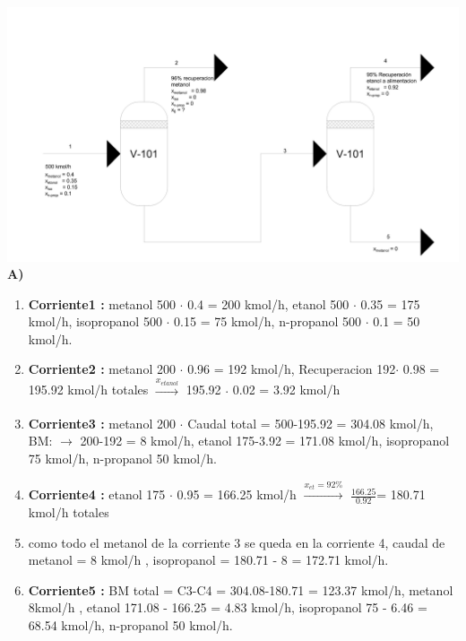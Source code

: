 \documentclass{report}
\begin{document}
\begin{raggedright}
	\includegraphics[width=1\textwidth]{problema1.jpg}\\
\textbf{A)}\\
\vspace{1\baselineskip}
\begin{enumerate}
	\item [] \textbf{Corriente1 :} metanol 500 $\cdot $ 0.4 = 200 kmol/h, etanol 500 $\cdot $ 0.35 = 175 kmol/h, isopropanol 500 $\cdot $ 0.15 = 75 kmol/h, n-propanol 500 $\cdot $ 0.1 = 50 kmol/h.\\
	\item [] \textbf{Corriente2 :} metanol 200 $\cdot $ 0.96 = 192 kmol/h, Recuperacion 192$\cdot$ 0.98 = 195.92 kmol/h totales $\xrightarrow[]{x_{etanol}}$ 195.92 $\cdot$ 0.02 = 3.92 kmol/h \\
	\item [] \textbf{Corriente3 :} metanol 200 $\cdot $ Caudal total = 500-195.92 = 304.08 kmol/h, BM: $\rightarrow$ 200-192 = 8 kmol/h, etanol 175-3.92 = 171.08 kmol/h, isopropanol 75 kmol/h, n-propanol 50 kmol/h.\\
	\item [] \textbf{Corriente4 :} etanol 175 $\cdot$ 0.95 = 166.25 kmol/h $\xrightarrow{x_{et}=92\%}$ $\frac{166.25}{0.92}$= 180.71 kmol/h totales
	\item [] como todo  el metanol de la corriente 3 se queda en la corriente 4, caudal de metanol = 8 kmol/h , isopropanol = 180.71 - 8 = 172.71 kmol/h.\\
	\item [] \textbf{Corriente5 :} BM total = C3-C4 = 304.08-180.71 = 123.37 kmol/h, metanol 8kmol/h , etanol 171.08 - 166.25 = 4.83 kmol/h, isopropanol 75 - 6.46 = 68.54 kmol/h, n-propanol 50 kmol/h.
\end{enumerate}
\end{raggedright}
\end{document}
